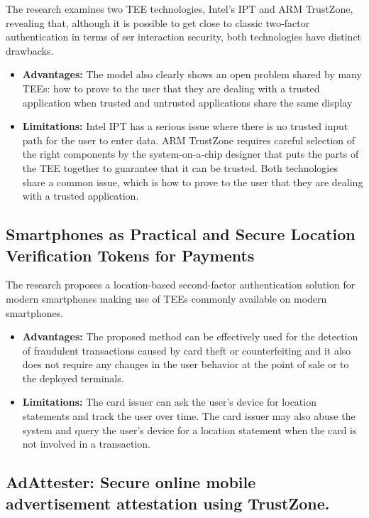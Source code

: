 \documentclass[conference]{IEEEtran}
\begin{document}
\cite{misc6} The research examines two TEE technologies, Intel’s IPT and ARM TrustZone, revealing that, although it is possible to get close to classic two-factor authentication in terms of ser interaction security, both technologies have distinct drawbacks.
\begin{itemize}
    \item \textbf{Advantages:} The model also clearly shows an open problem shared by many TEEs: how to prove to the user that they are dealing with a trusted application when trusted and untrusted applications share the same display
    \item \textbf{Limitations:} Intel IPT has a serious issue where there is no trusted input path for the user to enter data. ARM TrustZone requires careful selection of the right components by the system-on-a-chip designer that puts the parts of the TEE together to guarantee that it can be trusted. Both technologies share a common issue, which is how to prove to the user that they are dealing with a trusted application.
\end{itemize}


\subsection{Smartphones as Practical and Secure Location Verification Tokens for Payments}

\cite{misc7} The research proposes a location-based second-factor authentication solution for modern smartphones making use of TEEs commonly available on modern smartphones.
\begin{itemize}
    \item \textbf{Advantages:} The proposed method can be effectively used for the detection of fraudulent transactions caused by card theft or counterfeiting and it also does not require any changes in the user behavior at the point of sale or to the deployed terminals.
    \item \textbf{Limitations:} The card issuer can ask the user’s device for location statements and track the user over time. The card issuer may also abuse the system and query the user’s device for a location statement when the card is not involved in a transaction.
\end{itemize}


\subsection{AdAttester: Secure online mobile advertisement attestation using TrustZone.}
\end{document}
